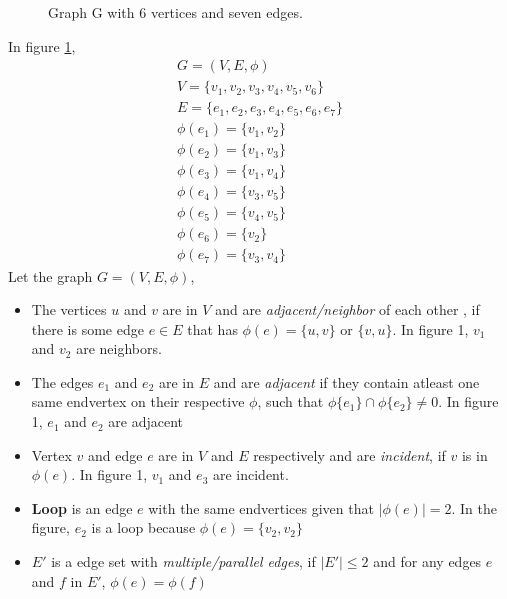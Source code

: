 \begin{itemize}
\begin{figure}[h]
\caption{Graph G with 6 vertices and seven edges.}
\label{graph1}
\end{figure}
In figure \ref{graph1}, 
\begin{equation}
\begin{array}{l}
G=(V,E,\phi) \\
V=\{v_1,v_2,v_3,v_4,v_5,v_6\} \\
E=\{e_1,e_2,e_3,e_4,e_5,e_6,e_7\} \\
\phi(e_1)=\{v_1,v_2\} \\
\phi(e_2)=\{v_1,v_3\} \\
\phi(e_3)=\{v_1,v_4\} \\
\phi(e_4)=\{v_3,v_5\} \\
\phi(e_5)=\{v_4,v_5\} \\
\phi(e_6)=\{v_2\} \\
\phi(e_7)=\{v_3,v_4\}
\end{array}
\end{equation}
Let the graph $G=(V,E,\phi)$,
	\begin{itemize}
\item The vertices $u$ and $v$ are in $V$ and are \textit{adjacent/neighbor} of each other , if there is some edge $e \in E$ that has $\phi(e)=\{u,v\}$ or $\{v,u\}$. In figure 1, $v_1$ and $v_2$ are neighbors.
\item The edges $e_1$ and $e_2$ are in $E$ and are \textit{adjacent} if they contain atleast one same endvertex on their respective $\phi$, such that $\phi\{e_1\} \cap \phi\{e_2\} \neq 0$. In figure 1, $e_1$ and $e_2$ are adjacent
\item Vertex $v$ and edge $e$ are in $V$ and $E$ respectively and are \textit{incident}, if $v$ is in $\phi(e)$. In figure 1, $v_1$ and $e_3$ are incident.
\item \textbf{Loop} is an edge $e$ with the same endvertices given that $|\phi(e)|=2$. In the figure, $e_2$ is a loop because $\phi(e)=\{v_2,v_2\}$
\item $E'$ is a edge set with \textit{multiple/parallel edges}, if $|E'| \leq 2$ and for any edges $e$ and $f$ in $E'$, $\phi(e)=\phi(f)$

\end{itemize}
\end{itemize}
